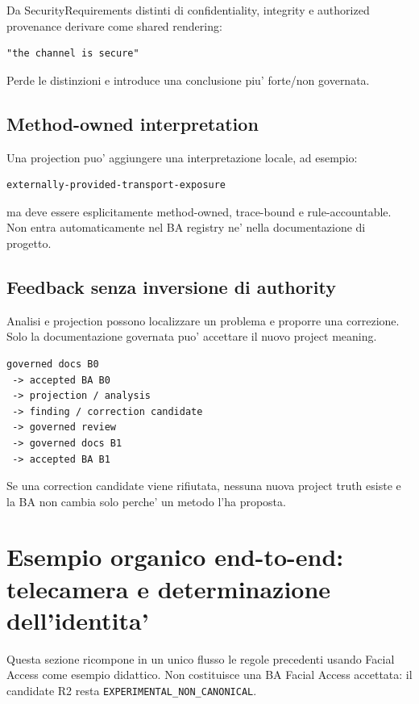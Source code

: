 \documentclass[11pt,a4paper]{article}
\newcommand{\code}[1]{\nolinkurl{#1}}
\begin{document}
\begin{badbox}
Da SecurityRequirements distinti di confidentiality, integrity e authorized provenance derivare come shared rendering:
\begin{lstlisting}
"the channel is secure"
\end{lstlisting}
Perde le distinzioni e introduce una conclusione piu' forte/non governata.
\end{badbox}

\subsection{Method-owned interpretation}

Una projection puo' aggiungere una interpretazione locale, ad esempio:

\begin{lstlisting}
externally-provided-transport-exposure
\end{lstlisting}

ma deve essere esplicitamente method-owned, trace-bound e rule-accountable. Non entra automaticamente nel BA registry ne' nella documentazione di progetto.


\subsection{Feedback senza inversione di authority}

\begin{statusclosed}
Analisi e projection possono localizzare un problema e proporre una correzione. Solo la documentazione governata puo' accettare il nuovo project meaning.
\end{statusclosed}

\begin{lstlisting}
governed docs B0
 -> accepted BA B0
 -> projection / analysis
 -> finding / correction candidate
 -> governed review
 -> governed docs B1
 -> accepted BA B1
\end{lstlisting}

Se una correction candidate viene rifiutata, nessuna nuova project truth esiste e la BA non cambia solo perche' un metodo l'ha proposta.


\section{Esempio organico end-to-end: telecamera e determinazione dell'identita'}
Questa sezione ricompone in un unico flusso le regole precedenti usando Facial Access come esempio didattico. Non costituisce una BA Facial Access accettata: il candidate R2 resta \code{EXPERIMENTAL_NON_CANONICAL}.
\end{document}
